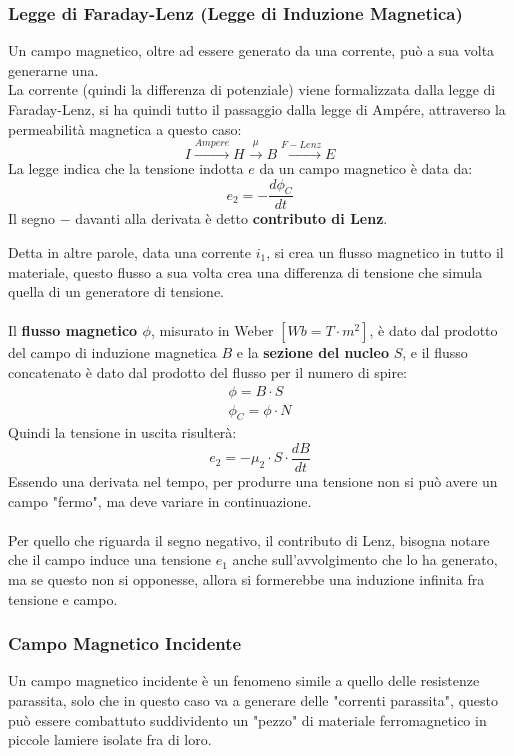 \documentclass[../main.tex]{subfiles}
\begin{document}
	\subsubsection{Legge di Faraday-Lenz (Legge di Induzione Magnetica)}
	\begin{definition}
		Un campo magnetico, oltre ad essere generato da una corrente, può a sua volta generarne una. \\
		La corrente (quindi la differenza di potenziale) viene formalizzata dalla legge di Faraday-Lenz, si ha quindi tutto il passaggio dalla legge di Ampére, attraverso la permeabilità magnetica a questo caso:
		\begin{equation}
			I\xrightarrow{Ampere} H \xrightarrow{\mu} B \xrightarrow{F-Lenz} E
		\end{equation}
		La legge indica che la tensione indotta $e$ da un campo magnetico è data da:
		\begin{equation}
			e_2=-\frac{d\phi_C}{dt}	
		\end{equation}
		Il segno $-$ davanti alla derivata è detto \textbf{contributo di Lenz}.
	\end{definition}
	Detta in altre parole, data una corrente $i_1$, si crea un flusso magnetico in tutto il materiale, questo flusso a sua volta crea una differenza di tensione che simula quella di un generatore di tensione.\\\\
	Il \textbf{flusso magnetico $\phi$}, misurato in Weber $\left[ Wb=T\cdot m^2 \right] $, è dato dal prodotto del campo di induzione magnetica $B$ e la \textbf{sezione del nucleo} $S$, e il flusso concatenato è dato dal prodotto del flusso per il numero di spire:
	\begin{gather}
		\phi=B\cdot S \\
		\phi_C=\phi\cdot N
	\end{gather}
	Quindi la tensione in uscita risulterà:
	\begin{equation}
		e_2=-\mu_2 \cdot S\cdot\frac{dB}{dt}	
	\end{equation}
	Essendo una derivata nel tempo, per produrre una tensione non si può avere un campo "fermo", ma deve variare in continuazione.\\\\
	Per quello che riguarda il segno negativo, il contributo di Lenz, bisogna notare che il campo induce una tensione $e_1$ anche sull'avvolgimento che lo ha generato, ma se questo non si opponesse, allora si formerebbe una induzione infinita fra tensione e campo.
	\subsubsection{Campo Magnetico Incidente}
	Un campo magnetico incidente è un fenomeno simile a quello delle resistenze parassita, solo che in questo caso va a generare delle "correnti parassita", questo può essere combattuto suddividento un "pezzo" di materiale ferromagnetico in piccole lamiere isolate fra di loro.
\end{document}
